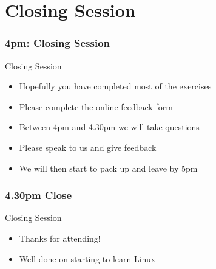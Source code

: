 \part{Closing Session}
\begin{frame}
\partpage
\end{frame}

\section{4pm: Closing Session}
\begin{frame}{Closing Session}
\begin{itemize}
\item Hopefully you have completed most of the exercises
\item Please complete the online feedback form
\item Between 4pm and 4.30pm we will take questions
\item Please speak to us and give feedback
\item We will then start to pack up and leave by 5pm
\end{itemize}
\end{frame}

\section{4.30pm Close}
\begin{frame}{Closing Session}
\begin{itemize}
\item Thanks for attending!
\item Well done on starting to learn Linux
\end{itemize}
\end{frame}


